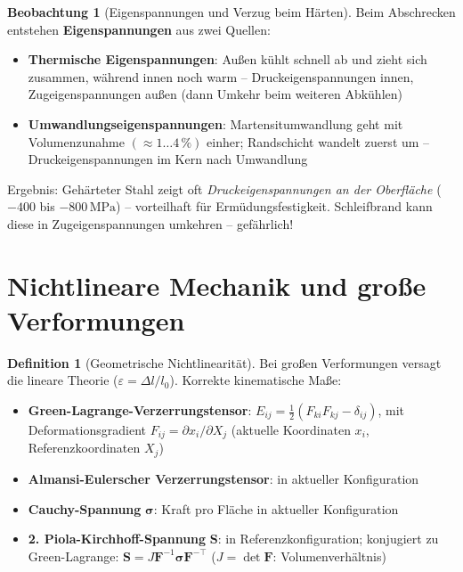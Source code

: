 ﻿\documentclass[a4paper,12pt]{report}
\theoremstyle{definition}
\newtheorem{definition}{Definition}
\newtheorem{beobachtung}{Beobachtung}
\begin{document}
\begin{beobachtung}[Eigenspannungen und Verzug beim Härten]
Beim Abschrecken entstehen \textbf{Eigenspannungen} aus zwei Quellen:
\begin{itemize}
    \item[-] \textbf{Thermische Eigenspannungen}: Außen kühlt schnell ab
          und zieht sich zusammen, während innen noch warm -- Druckeigenspannungen innen,
          Zugeigenspannungen außen (dann Umkehr beim weiteren Abkühlen)
    \item[-] \textbf{Umwandlungseigenspannungen}: Martensitumwandlung
          geht mit Volumenzunahme $(\approx 1\ldots4\,\%)$ einher;
          Randschicht wandelt zuerst um -- Druckeigenspannungen im Kern nach Umwandlung
\end{itemize}
Ergebnis: Gehärteter Stahl zeigt oft \emph{Druckeigenspannungen an der Oberfläche}
($-400$ bis $-800\,\mathrm{MPa}$) -- vorteilhaft für Ermüdungsfestigkeit.
Schleifbrand kann diese in Zugeigenspannungen umkehren -- gefährlich!
\end{beobachtung}

\section{Nichtlineare Mechanik und große Verformungen}

\begin{definition}[Geometrische Nichtlinearität]
Bei großen Verformungen versagt die lineare Theorie ($\varepsilon = \Delta l/l_0$).
Korrekte kinematische Maße:
\begin{itemize}
    \item[-] \textbf{Green-Lagrange-Verzerrungstensor}: $E_{ij} = \tfrac{1}{2}(F_{ki}F_{kj} - \delta_{ij})$,
          mit Deformationsgradient $F_{ij} = \partial x_i/\partial X_j$
          (aktuelle Koordinaten $x_i$, Referenzkoordinaten $X_j$)
    \item[-] \textbf{Almansi-Eulerscher Verzerrungstensor}: in aktueller Konfiguration
    \item[-] \textbf{Cauchy-Spannung} $\boldsymbol{\sigma}$: Kraft pro Fläche in aktueller Konfiguration
    \item[-] \textbf{2. Piola-Kirchhoff-Spannung} $\mathbf{S}$: in Referenzkonfiguration;
          konjugiert zu Green-Lagrange: $\mathbf{S} = J\mathbf{F}^{-1}\boldsymbol{\sigma}\mathbf{F}^{-\top}$
          ($J = \det\mathbf{F}$: Volumenverhältnis)
\end{itemize}
\end{definition}
\end{document}
